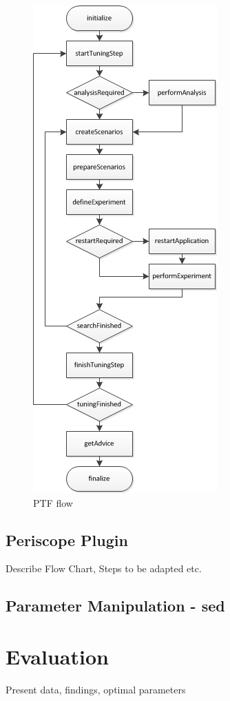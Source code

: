 \documentclass[10pt,twocolumn]{article}
\begin{document}
\begin{figure}[h]
	\centering
	\includegraphics[scale=0.5]{ptf_flow}
	\caption{PTF flow}
\end{figure}

\subsection{Periscope Plugin}
Describe Flow Chart, Steps to be adapted etc.

\subsection{Parameter Manipulation - sed}


\section{Evaluation}
\label{sec:evaluation}
Present data, findings, optimal parameters
\end{document}

